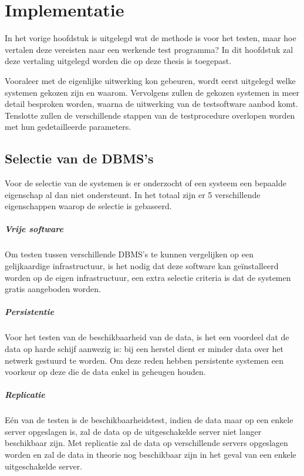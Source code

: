 \chapter{Implementatie}
In het vorige hoofdstuk is uitgelegd wat de methode is voor het testen, maar hoe vertalen deze vereisten naar een werkende test programma? In dit hoofdstuk zal deze vertaling uitgelegd worden die op deze thesis is toegepast. 

Vooraleer met de eigenlijke uitwerking kon gebeuren, wordt eerst uitgelegd welke systemen gekozen zijn en waarom. 
Vervolgens zullen de gekozen systemen in meer detail besproken worden, waarna de uitwerking van de testsoftware aanbod komt. Tenslotte zullen de verschillende stappen van de testprocedure overlopen worden met hun gedetailleerde parameters.  
\section{Selectie van de DBMS's}
Voor de selectie van de systemen is er onderzocht of een systeem een bepaalde eigenschap al dan niet ondersteunt. In het totaal zijn er 5 verschillende eigenschappen waarop de selectie is gebaseerd. 

\paragraph{Vrije software} Om testen tussen verschillende DBMS's te kunnen vergelijken op een gelijkaardige infrastructuur, is het nodig dat deze software kan geïnstalleerd worden op de eigen infrastructuur, een extra selectie criteria is dat de systemen gratis aangeboden worden. 

\paragraph{Persistentie} Voor het testen van de beschikbaarheid van de data, is het een voordeel dat de data op harde schijf aanwezig is: bij een herstel dient er minder data over het netwerk gestuurd te worden. Om deze reden hebben persistente systemen een voorkeur op deze die de data enkel in geheugen houden. 

\paragraph{Replicatie} Eén van de testen is de beschikbaarheidstest, indien de data maar op een enkele server opgeslagen is, zal de data op de uitgeschakelde server niet langer beschikbaar zijn. Met replicatie zal de data op verschillende servers opgeslagen worden en zal de data in theorie nog beschikbaar zijn in het geval van een enkele uitgeschakelde server. 

